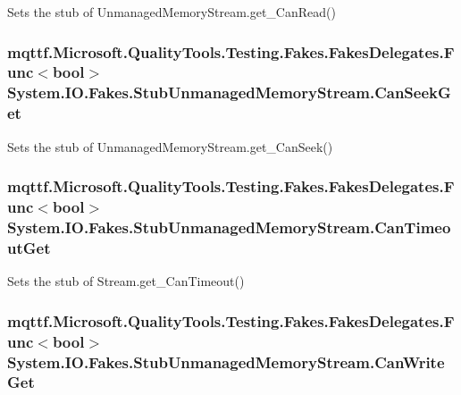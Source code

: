 Sets the stub of Unmanaged\-Memory\-Stream.\-get\-\_\-\-Can\-Read()

\hypertarget{class_system_1_1_i_o_1_1_fakes_1_1_stub_unmanaged_memory_stream_a39e595644b42aaf90cd41431c1c90a4d}{
\subsubsection[{Can\-Seek\-Get}]{\setlength{\rightskip}{0pt plus 5cm}mqttf.\-Microsoft.\-Quality\-Tools.\-Testing.\-Fakes.\-Fakes\-Delegates.\-Func$<$bool$>$ System.\-I\-O.\-Fakes.\-Stub\-Unmanaged\-Memory\-Stream.\-Can\-Seek\-Get}}\label{class_system_1_1_i_o_1_1_fakes_1_1_stub_unmanaged_memory_stream_a39e595644b42aaf90cd41431c1c90a4d}


Sets the stub of Unmanaged\-Memory\-Stream.\-get\-\_\-\-Can\-Seek()

\hypertarget{class_system_1_1_i_o_1_1_fakes_1_1_stub_unmanaged_memory_stream_a53e8625f5b15551f849effbc3fee70c9}{
\subsubsection[{Can\-Timeout\-Get}]{\setlength{\rightskip}{0pt plus 5cm}mqttf.\-Microsoft.\-Quality\-Tools.\-Testing.\-Fakes.\-Fakes\-Delegates.\-Func$<$bool$>$ System.\-I\-O.\-Fakes.\-Stub\-Unmanaged\-Memory\-Stream.\-Can\-Timeout\-Get}}\label{class_system_1_1_i_o_1_1_fakes_1_1_stub_unmanaged_memory_stream_a53e8625f5b15551f849effbc3fee70c9}


Sets the stub of Stream.\-get\-\_\-\-Can\-Timeout()

\hypertarget{class_system_1_1_i_o_1_1_fakes_1_1_stub_unmanaged_memory_stream_a5ea41a17d349102183ff6587db353ee0}{
\subsubsection[{Can\-Write\-Get}]{\setlength{\rightskip}{0pt plus 5cm}mqttf.\-Microsoft.\-Quality\-Tools.\-Testing.\-Fakes.\-Fakes\-Delegates.\-Func$<$bool$>$ System.\-I\-O.\-Fakes.\-Stub\-Unmanaged\-Memory\-Stream.\-Can\-Write\-Get}}\label{class_system_1_1_i_o_1_1_fakes_1_1_stub_unmanaged_memory_stream_a5ea41a17d349102183ff6587db353ee0}



